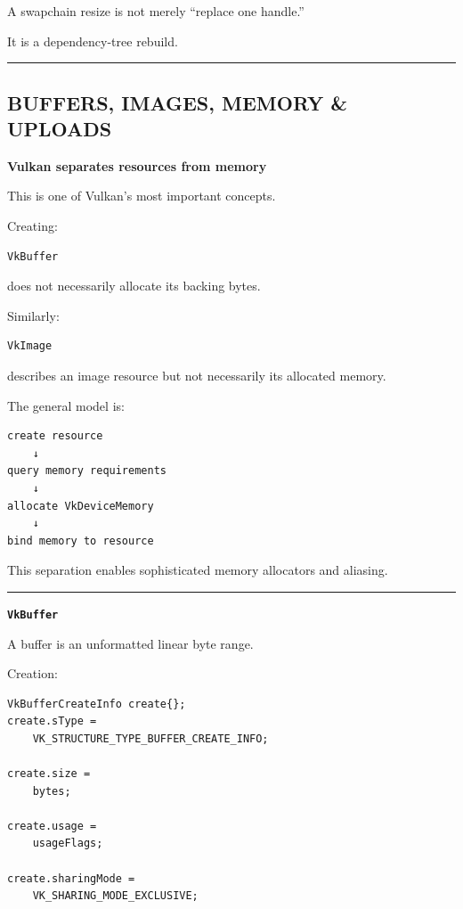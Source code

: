 A swapchain resize is not merely ``replace one handle.''

It is a dependency-tree rebuild.

\begin{center}\rule{0.5\linewidth}{0.5pt}\end{center}

\subsection{BUFFERS, IMAGES, MEMORY \& UPLOADS}\label{01-foundations-i-ch013-buffers-images-memory-uploads}

\hypertarget{01-foundations-i-ch013-buffers-images-memory-uploads}{}

\textbf{Vulkan separates resources from memory}

This is one of Vulkan's most important concepts.

Creating:

\begin{verbatim}
VkBuffer
\end{verbatim}

does not necessarily allocate its backing bytes.

Similarly:

\begin{verbatim}
VkImage
\end{verbatim}

describes an image resource but not necessarily its allocated memory.

The general model is:

\begin{verbatim}
create resource
    ↓
query memory requirements
    ↓
allocate VkDeviceMemory
    ↓
bind memory to resource
\end{verbatim}

This separation enables sophisticated memory allocators and aliasing.

\begin{center}\rule{0.5\linewidth}{0.5pt}\end{center}

\textbf{\texttt{VkBuffer}}

A buffer is an unformatted linear byte range.

Creation:

\begin{verbatim}
VkBufferCreateInfo create{};
create.sType =
    VK_STRUCTURE_TYPE_BUFFER_CREATE_INFO;

create.size =
    bytes;

create.usage =
    usageFlags;

create.sharingMode =
    VK_SHARING_MODE_EXCLUSIVE;
\end{verbatim}

